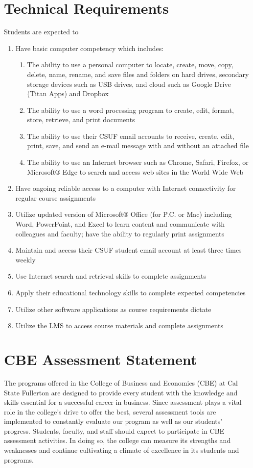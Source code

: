 \documentclass{syllabus}
\begin{document}
\section*{Technical Requirements}
Students are expected to
\begin{enumerate}
\item Have basic computer competency which includes:
\begin{enumerate}
\item	The ability to use a personal computer to locate, create, move, copy, delete, name, rename, and save files and folders on hard drives, secondary storage devices such as USB drives, and cloud such as Google Drive (Titan Apps) and Dropbox
\item	The ability to use a word processing program to create, edit, format, store, retrieve, and print documents
\item	The ability to use their CSUF email accounts to receive, create, edit, print, save, and send an e-mail message with and without an attached file
\item	The ability to use an Internet browser such as Chrome, Safari, Firefox, or Microsoft® Edge to search and access web sites in the World Wide Web
\end{enumerate}

\item	Have ongoing reliable access to a computer with Internet connectivity for regular course assignments
\item	Utilize updated version of Microsoft® Office (for P.C. or Mac) including Word, PowerPoint, and Excel to learn content and communicate with colleagues and faculty; have the ability to regularly print assignments
\item	Maintain and access their CSUF student email account at least three times weekly
\item	Use Internet search and retrieval skills to complete assignments
\item	Apply their educational technology skills to complete expected competencies
\item	Utilize other software applications as course requirements dictate
\item	Utilize the LMS to access course materials and complete assignments
\end{enumerate}



\section*{CBE Assessment Statement}
The programs offered in the College of Business and Economics (CBE) at Cal State Fullerton are designed to provide every student with the knowledge and skills essential for a successful career in business. Since assessment plays a vital role in the college's drive to offer the best, several assessment tools are implemented to constantly evaluate our program as well as our students' progress. Students, faculty, and staff should expect to participate in CBE assessment activities. In doing so, the college can measure its strengths and weaknesses and continue cultivating a climate of excellence in its students and programs.
\end{document}
